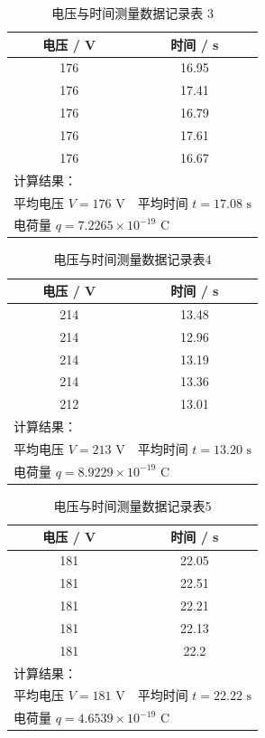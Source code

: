 \documentclass[11pt]{article}
\begin{document}
\begin{table}[htbp]
    \centering
    \caption{电压与时间测量数据记录表 3}
    \begin{tabular}{cc}
        \toprule
        电压 / V & 时间 / s \\
        \midrule
        176 & 16.95 \\
        176 & 17.41 \\
        176 & 16.79 \\
        176 & 17.61 \\
        176 & 16.67 \\
        \midrule
        \multicolumn{2}{l}{计算结果：} \\
        平均电压 $V = 176 \text{ V}$ & 平均时间 $t = 17.08 \text{ s}$ \\
        \multicolumn{2}{l}{电荷量 $q = 7.2265 \times 10^{-19} \text{ C}$} \\
        \bottomrule
    \end{tabular}
\end{table}

\begin{table}[htbp]
    \centering
    \caption{电压与时间测量数据记录表4}
    \begin{tabular}{cc}
        \toprule
        电压 / V & 时间 / s \\
        \midrule
        214 & 13.48 \\
        214 & 12.96 \\
        214 & 13.19 \\
        214 & 13.36 \\
        212 & 13.01 \\
        \midrule
        \multicolumn{2}{l}{计算结果：} \\
        平均电压 $V = 213 \text{ V}$ & 平均时间 $t = 13.20 \text{ s}$ \\
        \multicolumn{2}{l}{电荷量 $q = 8.9229 \times 10^{-19} \text{ C}$} \\
        \bottomrule
    \end{tabular}
\end{table}

\begin{table}[htbp]
    \centering
    \caption{电压与时间测量数据记录表5}
    \begin{tabular}{cc}
        \toprule
        电压 / V & 时间 / s \\
        \midrule
        181 & 22.05 \\
        181 & 22.51 \\
        181 & 22.21 \\
        181 & 22.13 \\
        181 & 22.2  \\
        \midrule
        \multicolumn{2}{l}{计算结果：} \\
        平均电压 $V = 181 \text{ V}$ & 平均时间 $t = 22.22 \text{ s}$ \\
        \multicolumn{2}{l}{电荷量 $q = 4.6539 \times 10^{-19} \text{ C}$} \\
        \bottomrule
    \end{tabular}
\end{table}
\end{document}
